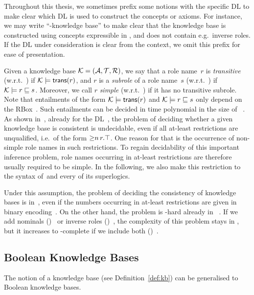 Throughout this thesis, we sometimes prefix some notions with the specific DL to
make clear which DL is used to construct the concepts or axioms.  For instance,
we may write \enquote{\ALC-knowledge base} to make clear that the knowledge base
is constructed using concepts expressible in \ALC, and does not contain e.g.\
inverse roles.  If the DL under consideration is clear from the context, we omit
this prefix for ease of presentation.

Given a knowledge base $\mathcal{K}=(\mathcal{A},\mathcal{T},\mathcal{R})$, we say that a role
name~$r$ is \emph{transitive} (w.r.t.\ \Kmc) if $\mathcal{K}\models\mathsf{trans}(r)$, and $r$
is a \emph{subrole} of a role name~$s$ (w.r.t.\ \Kmc) if $\mathcal{K}\models
r\sqsubseteq s$.  Moreover, we call $r$ \emph{simple} (w.r.t.~\Kmc) if it has no
transitive subrole.
%
Note that entailments of the form $\mathcal{K}\models\mathsf{trans}(r)$ and $\mathcal{K}\models
r\sqsubseteq s$ only depend on the RBox~\Rmc.  Such entailments can be decided
in time polynomial in the size of \Rmc~\cite{HoST-IGPL00}.
%
As shown in~\cite{HoST-IGPL00}, already for the DL~\SHQ, the problem of deciding
whether a given knowledge base is consistent is undecidable, even if all
at-least restrictions are unqualified, i.e.\ of the form ${\ge}n\,r.\top$.
One reason for that is the occurrence of non-simple role names in such
restrictions.  To regain decidability of this important inference problem, role
names occurring in at-least restrictions are therefore usually required to be
simple.  In the following, we also make this restriction to the
syntax of~\SHQ and every of its superlogics.

Under this assumption, the problem of deciding the consistency of knowledge
bases is in~\ExpTime, even if the numbers occurring in at-least restrictions are
given in binary encoding~\cite{Tob-PhD01}.  On the other hand, the problem is
\ExpTime-hard already in \ALC~\cite{Sch-IJCAI91}.  If we add nominals
(\SHOQ)~\cite{Sch-DKE94,HoSa-IJCAI01} or inverse roles
(\SHIQ)~\cite{Sch-DKE94,Tob-PhD01}, the complexity of this problem stays in
\ExpTime, but it increases to \NExpTime-complete if we include both
(\SHOIQ)~\cite{Sch-DKE94,Tob-JAIR00,Pra-JLLI05}.


\subsection{Boolean Knowledge Bases}

The notion of a knowledge base (see Definition~\ref{def:kb})
can be generalised to Boolean knowledge bases.


